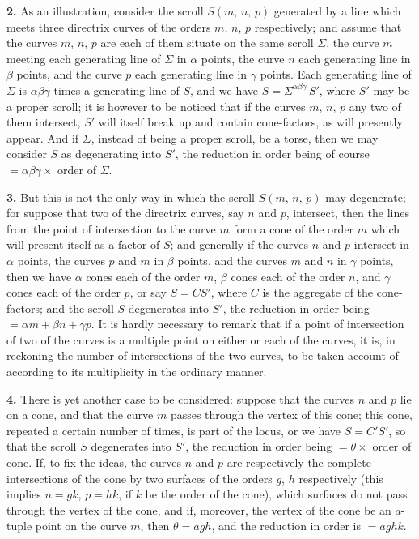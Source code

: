 \documentclass[11pt,a4paper]{article}
\begin{document}
\textbf{2.} As an illustration, consider the scroll $S(m,\,n,\,p)$ generated by a line which meets three directrix curves of the orders $m,\,n,\,p$ respectively; and assume that the curves $m,\,n,\,p$ are each of them situate on the same scroll $\Sigma$, the curve $m$ meeting each generating line of $\Sigma$ in $\alpha$ points, the curve $n$ each generating line in $\beta$ points, and the curve $p$ each generating line in $\gamma$ points. Each generating line of $\Sigma$ is $\alpha\beta\gamma$ times a generating line of $S$, and we have $S = \Sigma^{\alpha\beta\gamma}\,S'$, where $S'$ may be a proper scroll; it is however to be noticed that if the curves $m,\,n,\,p$ any two of them intersect, $S'$ will itself break up and contain cone-factors, as will presently appear. And if $\Sigma$, instead of being a proper scroll, be a torse, then we may consider $S$ as degenerating into $S'$, the reduction in order being of course $= \alpha\beta\gamma \times$ order of $\Sigma$.

\medskip

\textbf{3.} But this is not the only way in which the scroll $S(m,\,n,\,p)$ may degenerate; for suppose that two of the directrix curves, say $n$ and $p$, intersect, then the lines from the point of intersection to the curve $m$ form a cone of the order $m$ which will present itself as a factor of $S$; and generally if the curves $n$ and $p$ intersect in $\alpha$ points, the curves $p$ and $m$ in $\beta$ points, and the curves $m$ and $n$ in $\gamma$ points, then we have $\alpha$ cones each of the order $m$, $\beta$ cones each of the order $n$, and $\gamma$ cones each of the order $p$, or say $S = CS'$, where $C$ is the aggregate of the cone-factors; and the scroll $S$ degenerates into $S'$, the reduction in order being $= \alpha m + \beta n + \gamma p$. It is hardly necessary to remark that if a point of intersection of two of the curves is a multiple point on either or each of the curves, it is, in reckoning the number of intersections of the two curves, to be taken account of according to its multiplicity in the ordinary manner.

\medskip

\textbf{4.} There is yet another case to be considered: suppose that the curves $n$ and $p$ lie on a cone, and that the curve $m$ passes through the vertex of this cone; this cone, repeated a certain number of times, is part of the locus, or we have $S = C'S'$, so that the scroll $S$ degenerates into $S'$, the reduction in order being $= \theta \times$ order of cone. If, to fix the ideas, the curves $n$ and $p$ are respectively the complete intersections of the cone by two surfaces of the orders $g,\,h$ respectively (this implies $n = gk$, $p = hk$, if $k$ be the order of the cone), which surfaces do not pass through the vertex of the cone, and if, moreover, the vertex of the cone be an $a$-tuple point on the curve $m$, then $\theta = agh$, and the reduction in order is $= aghk$.
\end{document}
